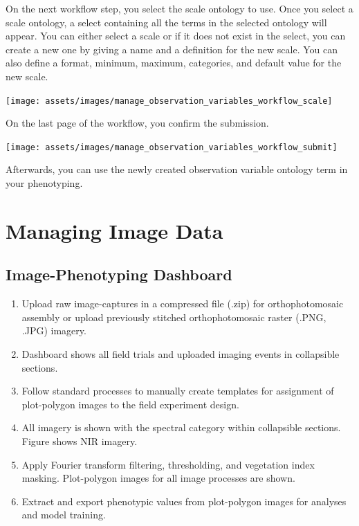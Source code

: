 \documentclass[
  12pt,
]{book}
\providecommand{\tightlist}{%
  \setlength{\itemsep}{0pt}\setlength{\parskip}{0pt}}
\begin{document}
On the next workflow step, you select the scale ontology to use. Once you select a scale ontology, a select containing all the terms in the selected ontology will appear. You can either select a scale or if it does not exist in the select, you can create a new one by giving a name and a definition for the new scale. You can also define a format, minimum, maximum, categories, and default value for the new scale.

\begin{center}\texttt{[image: assets/images/manage\_observation\_variables\_workflow\_scale]} \end{center}

On the last page of the workflow, you confirm the submission.

\begin{center}\texttt{[image: assets/images/manage\_observation\_variables\_workflow\_submit]} \end{center}

Afterwards, you can use the newly created observation variable ontology term in your phenotyping.

\hypertarget{managing-image-data}{%
\chapter{Managing Image Data}\label{managing-image-data}}

\hypertarget{image-phenotyping-dashboard}{%
\section{Image-Phenotyping Dashboard}\label{image-phenotyping-dashboard}}

\begin{enumerate}
\def\labelenumi{\arabic{enumi}.}
\tightlist
\item
  Upload raw image-captures in a compressed file (.zip) for orthophotomosaic assembly or upload previously stitched orthophotomosaic raster (.PNG, .JPG) imagery.
\item
  Dashboard shows all field trials and uploaded imaging events in collapsible sections.
\item
  Follow standard processes to manually create templates for assignment of plot-polygon images to the field experiment design.
\item
  All imagery is shown with the spectral category within collapsible sections. Figure shows NIR imagery.
\item
  Apply Fourier transform filtering, thresholding, and vegetation index masking. Plot-polygon images for all image processes are shown.
\item
  Extract and export phenotypic values from plot-polygon images for analyses and model training.
\end{enumerate}
\end{document}
